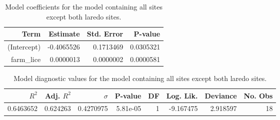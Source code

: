 \begin{table}
\centering
\caption{Model coefficients for the model containing all sites except
    both laredo sites.}
\centering
\begin{tabular}[t]{rrrr}
\toprule
Term & Estimate & Std. Error & P-value\\
\midrule
(Intercept) & -0.4065526 & 0.1713469 & 0.0305321\\
farm\_lice & 0.0000013 & 0.0000002 & 0.0000581\\
\bottomrule
\end{tabular}
\end{table}

\begin{table}
\centering
\caption{Model diagnostic values for the model containing all sites
    except both laredo sites.}
\centering
\begin{tabular}[t]{rrrrrrrr}
\toprule
$R^2$ & Adj. $R^2$ & $\sigma$ & P-value & DF & Log. Lik. & Deviance & No. Obs\\
\midrule
0.6463652 & 0.624263 & 0.4270975 & 5.81e-05 & 1 & -9.167475 & 2.918597 & 18\\
\bottomrule
\end{tabular}
\end{table}
